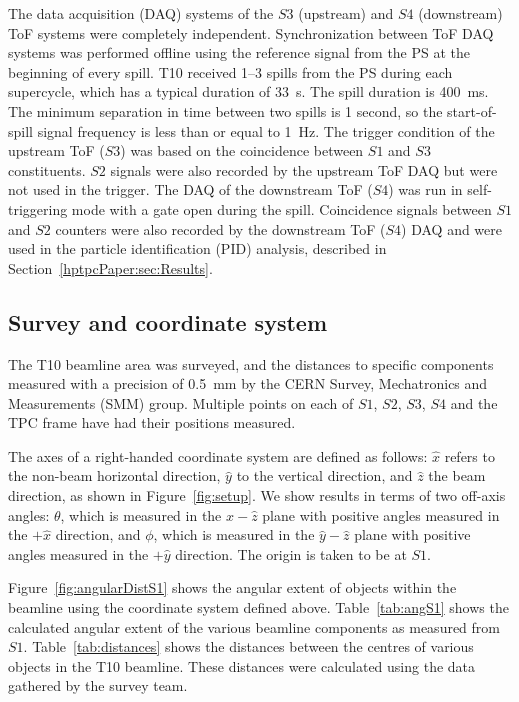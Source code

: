 The data acquisition (DAQ) systems of the $\mathit{S3}$ (upstream) and $\mathit{S4}$ (downstream) ToF systems were completely independent.
Synchronization between ToF DAQ systems was performed offline using the reference signal from the PS at the beginning of every spill.
T10 received 1--3 spills from the PS during each supercycle, which has a typical duration of 33~s.
The spill duration is 400~ms.
The minimum separation in time between two spills is 1 second, so the start-of-spill signal frequency is less than or equal to 1~Hz.
The trigger condition of the upstream ToF ($\mathit{S3}$) was based on the coincidence between $\mathit{S1}$ and $\mathit{S3}$ constituents.
$\mathit{S2}$ signals were also recorded by the upstream ToF DAQ but were not used in the trigger.
The DAQ of the downstream ToF ($\mathit{S4}$) was run in self-triggering mode with a gate open during the spill.
Coincidence signals between $\mathit{S1}$ and $\mathit{S2}$ counters were also recorded by the downstream ToF ($\mathit{S4}$) DAQ and were used in the particle identification (PID) analysis, described in Section~\ref{hptpcPaper:sec:Results}.  

\subsection{Survey and coordinate system}
\label{sec:coord}
The T10 beamline area was surveyed, and the distances to specific components measured with a precision of 0.5~mm by the CERN Survey, Mechatronics and Measurements (SMM) group.
Multiple points on each of $\mathit{S1}$, $\mathit{S2}$, $\mathit{S3}$, $\mathit{S4}$ and the TPC frame have had their positions measured.

The axes of a right-handed coordinate system are defined as follows: $\hat{x}$ refers to the non-beam horizontal direction, $\hat{y}$ to the vertical direction, and $\hat{z}$ the beam direction, as shown in Figure~\ref{fig:setup}.
We show results in terms of two off-axis angles: $\theta$, which is measured in the $\hat{x}-\hat{z}$ plane with positive angles measured in the $+\hat{x}$ direction, and $\phi$, which is measured in the $\hat{y}-\hat{z}$ plane with positive angles measured in the $+\hat{y}$ direction.
The origin is taken to be at $\mathit{S1}$.

Figure~\ref{fig:angularDistS1} shows the angular extent of objects within the beamline using the coordinate system defined above.
Table~\ref{tab:angS1} shows the calculated angular extent of the various beamline components as measured from $\mathit{S1}$.
Table~\ref{tab:distances} shows the distances between the centres of various objects in the T10 beamline.
These distances were calculated using the data gathered by the survey team.

